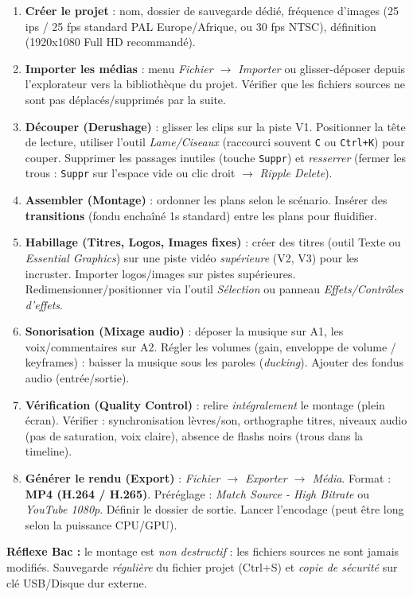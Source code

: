 \documentclass[11pt]{article}
\begin{document}
\begin{methode}
\begin{enumerate}
  \item \textbf{Créer le projet} : nom, dossier de sauvegarde dédié, fréquence d'images (25 ips / 25 fps standard PAL Europe/Afrique, ou 30 fps NTSC), définition (1920x1080 Full HD recommandé).
  \item \textbf{Importer les médias} : menu \emph{Fichier $\to$ Importer} ou glisser-déposer depuis l'explorateur vers la bibliothèque du projet. Vérifier que les fichiers sources ne sont pas déplacés/supprimés par la suite.
  \item \textbf{Découper (Derushage)} : glisser les clips sur la piste V1. Positionner la tête de lecture, utiliser l'outil \emph{Lame/Ciseaux} (raccourci souvent \texttt{C} ou \texttt{Ctrl+K}) pour couper. Supprimer les passages inutiles (touche \texttt{Suppr}) et \emph{resserrer} (fermer les trous : \texttt{Suppr} sur l'espace vide ou clic droit $\to$ \emph{Ripple Delete}).
  \item \textbf{Assembler (Montage)} : ordonner les plans selon le scénario. Insérer des \textbf{transitions} (fondu enchaîné 1s standard) entre les plans pour fluidifier.
  \item \textbf{Habillage (Titres, Logos, Images fixes)} : créer des titres (outil Texte ou \emph{Essential Graphics}) sur une piste vidéo \emph{supérieure} (V2, V3) pour les incruster. Importer logos/images sur pistes supérieures. Redimensionner/positionner via l'outil \emph{Sélection} ou panneau \emph{Effets/Contrôles d'effets}.
  \item \textbf{Sonorisation (Mixage audio)} : déposer la musique sur A1, les voix/commentaires sur A2. Régler les volumes (gain, enveloppe de volume / keyframes) : baisser la musique sous les paroles (\emph{ducking}). Ajouter des fondus audio (entrée/sortie).
  \item \textbf{Vérification (Quality Control)} : relire \emph{intégralement} le montage (plein écran). Vérifier : synchronisation lèvres/son, orthographe titres, niveaux audio (pas de saturation, voix claire), absence de flashs noirs (trous dans la timeline).
  \item \textbf{Générer le rendu (Export)} : \emph{Fichier $\to$ Exporter $\to$ Média}. Format : \textbf{MP4 (H.264 / H.265)}. Préréglage : \emph{Match Source - High Bitrate} ou \emph{YouTube 1080p}. Définir le dossier de sortie. Lancer l'encodage (peut être long selon la puissance CPU/GPU).
\end{enumerate}
\textbf{Réflexe Bac :} le montage est \emph{non destructif} : les fichiers sources ne sont jamais modifiés. Sauvegarde \emph{régulière} du fichier projet (Ctrl+S) et \emph{copie de sécurité} sur clé USB/Disque dur externe.
\end{methode}
\end{document}

